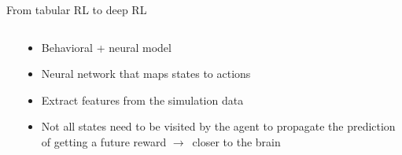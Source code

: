 \documentclass[bigger]{beamer}
\begin{document}
\begin{frame}[label={sec:org1e89f75}]{From tabular RL to deep RL}
\begin{columns}
\begin{column}[t]{0.55\columnwidth}
\begin{adjustbox}{max width=\textwidth, keepaspectratio}
\end{adjustbox}
\end{column}

\begin{column}[t]{0.45\columnwidth}
\footnotesize
\begin{itemize}
\item Behavioral + neural model
\item Neural network that maps states to actions
\item Extract features from the simulation data
\item Not all states need to be visited by the agent to propagate the prediction of getting a future reward \(\to\)~closer to the brain
\end{itemize}
\end{column}
\end{columns}
\end{frame}
\end{document}
